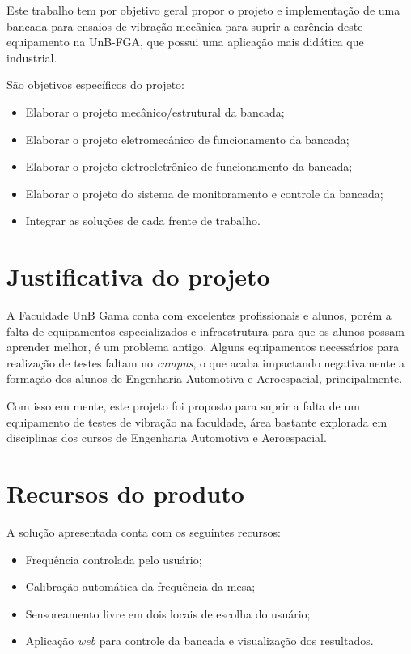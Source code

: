     Este trabalho tem por objetivo geral propor o projeto e implementação
    de uma bancada para ensaios de vibração mecânica para suprir a carência
    deste equipamento na UnB-FGA, que possui uma aplicação mais didática
    que industrial.

   São objetivos específicos do projeto:
   \begin{itemize}
    \item Elaborar o projeto mecânico/estrutural da bancada;
    \item Elaborar o projeto eletromecânico de funcionamento da bancada;
    \item Elaborar o projeto eletroeletrônico de funcionamento da bancada;
    \item Elaborar o projeto do sistema de monitoramento e controle da bancada;
    \item Integrar as soluções de cada frente de trabalho.
   \end{itemize}
  
\section*{Justificativa do projeto}
	
    
    A Faculdade UnB Gama conta com excelentes profissionais e alunos, porém 
    a falta de equipamentos especializados e infraestrutura para que os alunos 
    possam aprender melhor, é um problema antigo. Alguns equipamentos
    necessários para realização de testes faltam no \textit{campus}, o que
    acaba impactando negativamente a formação dos alunos de Engenharia
    Automotiva e Aeroespacial, principalmente.
    
    Com isso em mente, este projeto foi proposto para suprir a falta de
    um equipamento de testes de vibração na faculdade, área bastante explorada
    em disciplinas dos cursos de Engenharia Automotiva e Aeroespacial.
    

\section*{Recursos do produto}
	
    A solução apresentada conta com os seguintes recursos:
    
    \begin{itemize}
        \item Frequência controlada pelo usuário;
    	\item Calibração automática da frequência da mesa;
        \item Sensoreamento livre em dois locais de escolha do usuário;
        \item Aplicação \textit{web} para controle da bancada e visualização
        	  dos resultados.
    \end{itemize}
    
